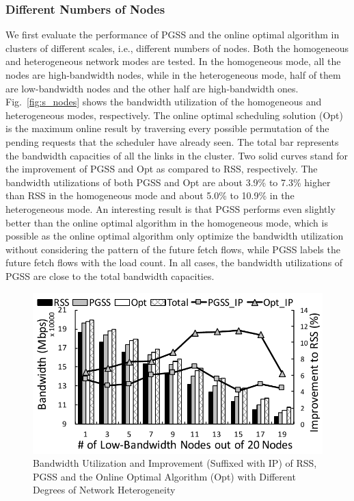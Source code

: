 \documentclass[10pt,journal,compsoc]{IEEEtran}
\begin{document}
\subsubsection{Different Numbers of Nodes}\label{section:differentNodeNumber}
We first evaluate the performance of PGSS and the online optimal algorithm in clusters of
different scales, i.e., different numbers of nodes.
Both the homogeneous and heterogeneous network modes are tested. 
In the homogeneous mode, all the nodes are high-bandwidth nodes, 
while in the heterogeneous mode, half of them are low-bandwidth nodes
and the other half are high-bandwidth ones.
Fig.~\ref{fig:s_nodes} shows the bandwidth utilization of the homogeneous and
heterogeneous modes,
respectively. 
The online optimal scheduling solution (Opt) is the maximum online result by traversing every possible permutation of the pending requests that the scheduler have already seen. 
The total bar represents the bandwidth capacities of all the links in the cluster. Two solid curves stand for the improvement of PGSS and Opt as compared to RSS, respectively.
The bandwidth utilizations of both PGSS and Opt 
are about 3.9\% to 7.3\% higher than RSS in the homogeneous mode
and about 5.0\% to 10.9\% in the heterogeneous mode. 
An interesting result is that PGSS performs even slightly better than the online optimal algorithm in the homogeneous mode, which is possible as the online optimal algorithm only optimize the bandwidth utilization without considering the pattern of the future fetch flows, while PGSS labels the future fetch flows with the load count. 
In all cases, the bandwidth utilizations of PGSS are close to the total bandwidth capacities.

\begin{figure}[!t]
\centering

\includegraphics[width=0.8\columnwidth,height=0.4\columnwidth]{figure14}

\caption{Bandwidth Utilization and Improvement (Suffixed with   IP) of RSS, PGSS and the Online Optimal Algorithm (Opt) with Different Degrees of Network Heterogeneity}
\label{fig:s_lowbandwidth}
\end{figure}
\end{document}
